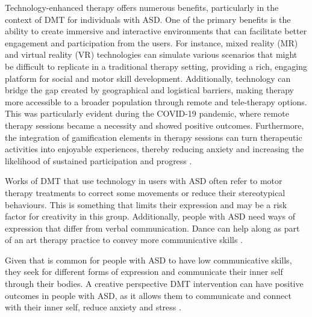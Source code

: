\documentclass[a4paper,fleqn]{cas-sc}
\begin{document}

Technology-enhanced therapy offers numerous benefits, particularly in the context of DMT for individuals with ASD. One of the primary benefits is the ability to create immersive and interactive environments that can facilitate better engagement and participation from the users. For instance, mixed reality (MR) and virtual reality (VR) technologies can simulate various scenarios that might be difficult to replicate in a traditional therapy setting, providing a rich, engaging platform for social and motor skill development. Additionally, technology can bridge the gap created by geographical and logistical barriers, making therapy more accessible to a broader population through remote and tele-therapy options. This was particularly evident during the COVID-19 pandemic, where remote therapy sessions became a necessity and showed positive outcomes. Furthermore, the integration of gamification elements in therapy sessions can turn therapeutic activities into enjoyable experiences, thereby reducing anxiety and increasing the likelihood of sustained participation and progress \cite{Parsons2011, Zhang2022}.

Works of DMT that use technology in users with ASD often refer to motor therapy treatments to correct some movements or reduce their stereotypical behaviours. This is something that limits their expression and may be a risk factor for creativity in this group. Additionally, people with ASD need ways of expression that differ from verbal communication. Dance can help along as part of an art therapy practice to convey more communicative skills \cite{Takahashi2019}.

Given that is common for people with ASD to have low communicative skills, they seek for different forms of expression and communicate their inner self through their bodies. A creative perspective DMT intervention can have positive outcomes in people with ASD, as it allows them to communicate and connect with their inner self,  reduce anxiety and stress \cite{Martin18}.


\end{document}
